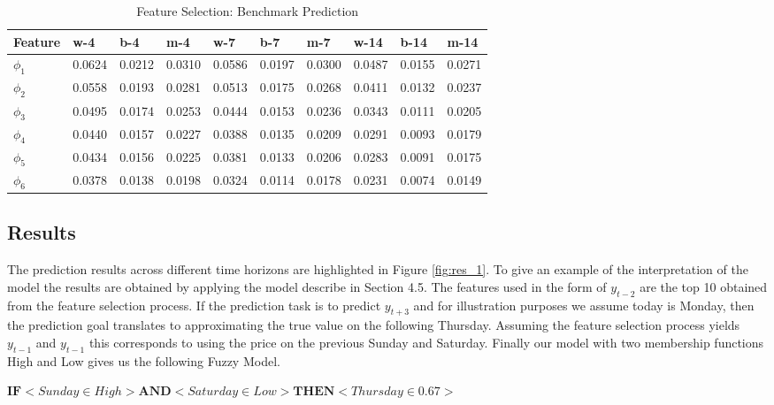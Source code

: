 \begin{table}[H]
\centering
\begin{tabular}{ |p{2cm}|p{1cm}|p{1cm}|p{1cm}|p{1cm}|p{1cm}|p{1cm}|p{1cm}|p{1cm}|p{1cm}| }
  \hline
 Feature & w-4 & b-4 & m-4 & w-7 & b-7 & m-7 & w-14 & b-14 & m-14   \\
 \hline

 $\phi_1$ & 0.0624   & 0.0212   & 0.0310 &  0.0586  & 0.0197 & 0.0300 & 0.0487 & 0.0155 & 0.0271\\
  \hline
  $\phi_2$ & 0.0558 & 0.0193 & 0.0281 & 0.0513 & 0.0175 & 0.0268 & 0.0411 & 0.0132 & 0.0237 \\
  \hline
  $\phi_3$ & 0.0495 & 0.0174 & 0.0253 & 0.0444 & 0.0153 & 0.0236 & 0.0343 & 0.0111 & 0.0205 \\
  \hline 
  $\phi_4$ & 0.0440 & 0.0157 & 0.0227 & 0.0388 & 0.0135 & 0.0209 & 0.0291 & 0.0093 & 0.0179 \\
  \hline 
  $\phi_5$ & 0.0434 & 0.0156 & 0.0225 & 0.0381 & 0.0133 & 0.0206 & 0.0283 & 0.0091 & 0.0175 \\
  \hline
  $\phi_6$ & 0.0378 & 0.0138 & 0.0198 & 0.0324 & 0.0114 & 0.0178 & 0.0231 & 0.0074 & 0.0149 \\
  \hline
 \end{tabular}
\caption{Feature Selection: Benchmark Prediction}
\label{tab:feat_mod1}
\end{table}



\subsection{Results}

The prediction results across different time horizons are highlighted in Figure \ref{fig:res_1}. To give an example of the interpretation of the model the results are obtained by applying the model describe in Section 4.5. The features used in the form of $y_{t-2}$ are the top 10 obtained from the feature selection process. If the prediction task is to predict $y_{t+3}$ and for illustration purposes we assume today is Monday, then the prediction goal translates to approximating the true value on the following Thursday. Assuming the feature selection process yields $y_{t-1}$  and $y_{t-1}$ this corresponds to using the price on the previous Sunday and Saturday. Finally our model with two membership functions High and Low gives us the following Fuzzy Model. \\

\centerline {$ \textbf{IF} <  Sunday \in High> \textbf{AND} < Saturday \in Low > \textbf{THEN} <  Thursday \in 0.67 > $} 

